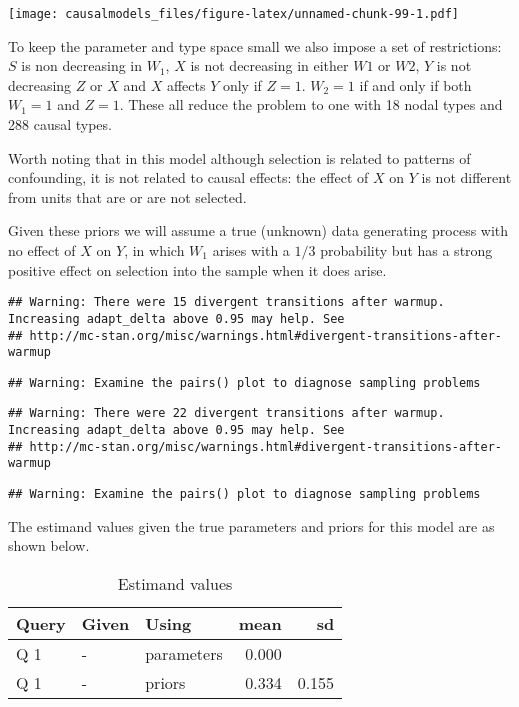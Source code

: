\documentclass[
  12pt,
]{book}
\begin{document}
\texttt{[image: causalmodels\_files/figure-latex/unnamed-chunk-99-1.pdf]}

To keep the parameter and type space small we also impose a set of restrictions: \(S\) is non decreasing in \(W_1\), \(X\) is not decreasing in either \(W1\) or \(W2\), \(Y\) is not decreasing \(Z\) or \(X\) and \(X\) affects \(Y\) only if \(Z=1\). \(W_2=1\) if and only if both \(W_1=1\) and \(Z=1\). These all reduce the problem to one with 18 nodal types and 288 causal types.

Worth noting that in this model although selection is related to patterns of confounding, it is not related to causal effects: the effect of \(X\) on \(Y\) is not different from units that are or are not selected.

Given these priors we will assume a true (unknown) data generating process with no effect of \(X\) on \(Y\), in which \(W_1\) arises with a \(1/3\) probability but has a strong positive effect on selection into the sample when it does arise.

\begin{verbatim}
## Warning: There were 15 divergent transitions after warmup. Increasing adapt_delta above 0.95 may help. See
## http://mc-stan.org/misc/warnings.html#divergent-transitions-after-warmup
\end{verbatim}

\begin{verbatim}
## Warning: Examine the pairs() plot to diagnose sampling problems
\end{verbatim}

\begin{verbatim}
## Warning: There were 22 divergent transitions after warmup. Increasing adapt_delta above 0.95 may help. See
## http://mc-stan.org/misc/warnings.html#divergent-transitions-after-warmup
\end{verbatim}

\begin{verbatim}
## Warning: Examine the pairs() plot to diagnose sampling problems
\end{verbatim}

The estimand values given the true parameters and priors for this model are as shown below.

\begin{table}

\caption{\label{tab:appsimpleselcconf5}Estimand values}
\centering
\begin{tabular}[t]{l|l|l|r|r}
\hline
Query & Given & Using & mean & sd\\
\hline
Q 1 & - & parameters & 0.000 & \\
\hline
Q 1 & - & priors & 0.334 & 0.155\\
\hline
\end{tabular}
\end{table}
\end{document}
